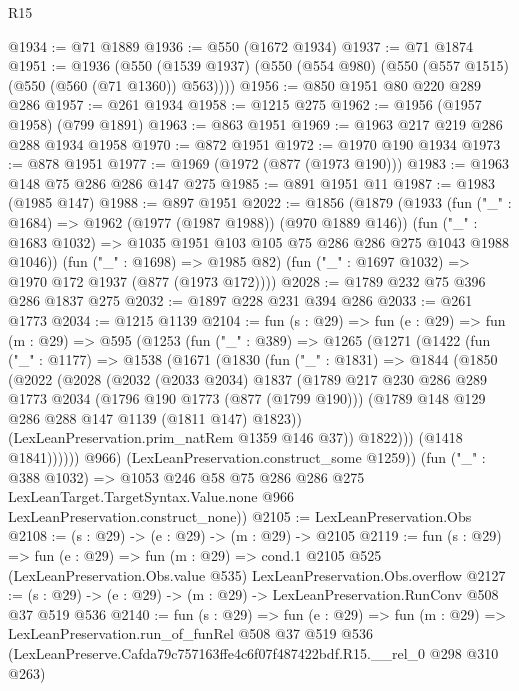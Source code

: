 \begin{lexlean}{R15}
\begin{coremodule}
@1934 := @71 @1889
@1936 := @550 (@1672 @1934)
@1937 := @71 @1874
@1951 := @1936
    (@550 (@1539 @1937) (@550 (@554 @980) (@550 (@557 @1515) (@550 (@560 (@71 @1360)) @563))))
@1956 := @850 @1951 @80 @220 @289 @286
@1957 := @261 @1934
@1958 := @1215 @275
@1962 := @1956 (@1957 @1958) (@799 @1891)
@1963 := @863 @1951
@1969 := @1963 @217 @219 @286 @288 @1934 @1958
@1970 := @872 @1951
@1972 := @1970 @190 @1934
@1973 := @878 @1951
@1977 := @1969 (@1972 (@877 (@1973 @190)))
@1983 := @1963 @148 @75 @286 @286 @147 @275
@1985 := @891 @1951 @11
@1987 := @1983 (@1985 @147)
@1988 := @897 @1951
@2022 := @1856
    (@1879
      (@1933
        (fun ("_" : @1684) => @1962 (@1977 (@1987 @1988)) (@970 @1889 @146))
        (fun ("_" : @1683 @1032) => @1035 @1951 @103 @105 @75 @286 @286 @275 @1043 @1988 @1046))
      (fun ("_" : @1698) => @1985 @82)
      (fun ("_" : @1697 @1032) => @1970 @172 @1937 (@877 (@1973 @172))))
@2028 := @1789 @232 @75 @396 @286 @1837 @275
@2032 := @1897 @228 @231 @394 @286
@2033 := @261 @1773
@2034 := @1215 @1139
@2104 := fun (s : @29) =>
  fun (e : @29) =>
  fun (m : @29) =>
  @595
    (@1253
      (fun ("_" : @389) =>
      @1265
        (@1271
          (@1422
            (fun ("_" : @1177) =>
            @1538
              (@1671
                (@1830
                  (fun ("_" : @1831) =>
                  @1844
                    (@1850
                      (@2022
                        (@2028
                          (@2032
                            (@2033 @2034)
                            @1837
                            (@1789
                              @217
                              @230
                              @286
                              @289
                              @1773
                              @2034
                              (@1796 @190 @1773 (@877 (@1799 @190)))
                              (@1789 @148 @129 @286 @288 @147 @1139 (@1811 @147) @1823))
                            (LexLeanPreservation.prim_natRem @1359 @146 @37))
                          @1822)))
                    (@1418 @1841))))))
          @966)
        (LexLeanPreservation.construct_some @1259))
      (fun ("_" : @388 @1032) =>
      @1053
        @246
        @58
        @75
        @286
        @286
        @275
        LexLeanTarget.TargetSyntax.Value.none
        @966
        LexLeanPreservation.construct_none))
@2105 := LexLeanPreservation.Obs
@2108 := (s : @29) -> (e : @29) -> (m : @29) -> @2105
@2119 := fun (s : @29) =>
  fun (e : @29) =>
  fun (m : @29) =>
  cond.{1} @2105 @525 (LexLeanPreservation.Obs.value @535) LexLeanPreservation.Obs.overflow
@2127 := (s : @29) -> (e : @29) -> (m : @29) -> LexLeanPreservation.RunConv @508 @37 @519 @536
@2140 := fun (s : @29) =>
  fun (e : @29) =>
  fun (m : @29) =>
  LexLeanPreservation.run_of_funRel
    @508
    @37
    @519
    @536
    (LexLeanPreserve.Cafda79c757163ffe4c6f07f487422bdf.R15.__rel_0 @298 @310 @263)
\end{coremodule}
\end{lexlean}
